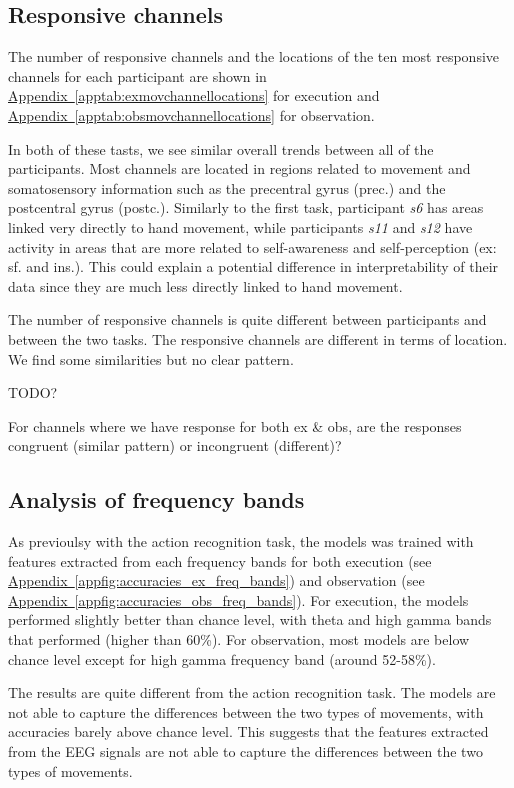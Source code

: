 \documentclass[10pt,conference,compsocconf]{IEEEtran}
\newcommand{\aref}[1]{\hyperref[#1]{Appendix~\ref*{#1}}}
\begin{document}
\subsection{Responsive channels}
The number of responsive channels and the locations of the ten most responsive channels for each participant are shown in \aref{apptab:exmovchannellocations} for execution and \aref{apptab:obsmovchannellocations} for observation.

In both of these tasts, we see similar overall trends between all of the participants. Most channels are located in regions related to movement and somatosensory information such as the precentral gyrus (prec.) and the postcentral gyrus (postc.). Similarly to the first task, participant \textit{s6} has areas linked very directly to hand movement, while participants \textit{s11} and \textit{s12} have activity in areas that are more related to self-awareness and self-perception (ex: sf. and ins.). This could explain a potential difference in interpretability of their data since they are much less directly linked to hand movement.

The number of responsive channels is quite different between participants and between the two tasks. The responsive channels are different in terms of location. We find some similarities but no clear pattern.

TODO?

For channels where we have response for both ex \& obs, are the responses congruent (similar pattern) or incongruent (different)?

\subsection{Analysis of frequency bands}
As previoulsy with the action recognition task, the models was trained with features extracted from each frequency bands for both execution (see \aref{appfig:accuracies_ex_freq_bands}) and observation (see \aref{appfig:accuracies_obs_freq_bands}). For execution, the models performed slightly better than chance level, with theta and high gamma bands that performed (higher than 60\%). For observation, most models are below chance level except for high gamma frequency band (around 52-58\%).

The results are quite different from the action recognition task. The models are not able to capture the differences between the two types of movements, with accuracies barely above chance level. This suggests that the features extracted from the EEG signals are not able to capture the differences between the two types of movements.
\end{document}
